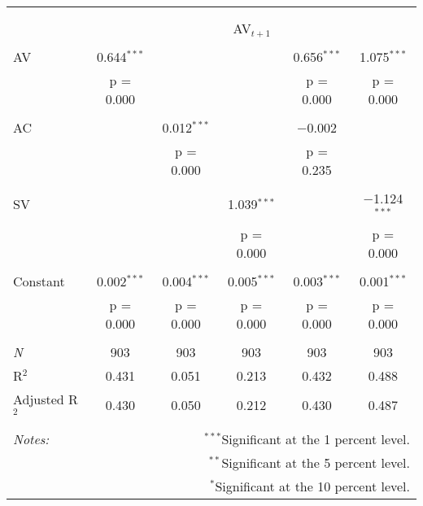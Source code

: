 
\begin{tabular}{@{\extracolsep{5pt}}lccccc} 
\\[-1.8ex]\hline 
\hline \\[-1.8ex] 
\\[-1.8ex] & \multicolumn{5}{c}{AV$_{t+1}$} \\ 
\hline \\[-1.8ex] 
 AV & 0.644$^{***}$ &  &  & 0.656$^{***}$ & 1.075$^{***}$ \\ 
  & p = 0.000 &  &  & p = 0.000 & p = 0.000 \\ 
  & & & & & \\ 
 AC &  & 0.012$^{***}$ &  & $-$0.002 &  \\ 
  &  & p = 0.000 &  & p = 0.235 &  \\ 
  & & & & & \\ 
 SV &  &  & 1.039$^{***}$ &  & $-$1.124$^{***}$ \\ 
  &  &  & p = 0.000 &  & p = 0.000 \\ 
  & & & & & \\ 
 Constant & 0.002$^{***}$ & 0.004$^{***}$ & 0.005$^{***}$ & 0.003$^{***}$ & 0.001$^{***}$ \\ 
  & p = 0.000 & p = 0.000 & p = 0.000 & p = 0.000 & p = 0.000 \\ 
  & & & & & \\ 
\textit{N} & 903 & 903 & 903 & 903 & 903 \\ 
R$^{2}$ & 0.431 & 0.051 & 0.213 & 0.432 & 0.488 \\ 
Adjusted R$^{2}$ & 0.430 & 0.050 & 0.212 & 0.430 & 0.487 \\ 
\hline 
\hline \\[-1.8ex] 
\textit{Notes:} & \multicolumn{5}{r}{$^{***}$Significant at the 1 percent level.} \\ 
 & \multicolumn{5}{r}{$^{**}$Significant at the 5 percent level.} \\ 
 & \multicolumn{5}{r}{$^{*}$Significant at the 10 percent level.} \\ 
\end{tabular} 
